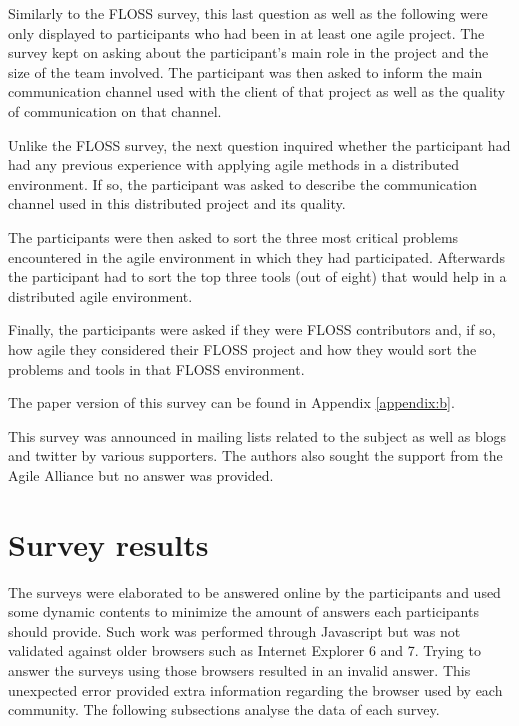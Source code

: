 \documentclass[lnbip]{svmultln}
\newcommand{\footnoterecall}[1]{
  \footnotemark[\value{#1}]
}
\begin{document}
Similarly to the FLOSS survey, this last question as well as the
following were only displayed to participants who had been in at least
one agile project. The survey kept on asking about the participant's
main role in the project and the size of the team involved. The
participant was then asked to inform the main communication channel
used with the client of that project as well as the quality of
communication on that channel.

Unlike the FLOSS survey, the next question inquired whether the
participant had had any previous experience with applying agile
methods in a distributed environment. If so, the participant was asked
to describe the communication channel used in this distributed project
and its quality.

The participants were then asked to sort the three most critical
problems encountered in the agile environment in which they had
participated. Afterwards the participant had to sort the top three
tools (out of eight) that would help in a distributed agile
environment.

Finally, the participants were asked if they were FLOSS contributors
and, if so, how agile they considered their FLOSS project and how
they would sort the problems and tools in that FLOSS environment.

The paper version of this survey can be found in Appendix
\ref{appendix:b}.\footnoterecall{onlineoff}

This survey was announced in mailing lists related to the subject as
well as blogs and twitter by various supporters. The authors also
sought the support from the Agile Alliance but no answer was provided.

\section{Survey results}
\label{sec:results}

The surveys were elaborated to be answered online by the participants
and used some dynamic contents to minimize the amount of answers each
participants should provide. Such work was performed through
Javascript but was not validated against older browsers such as
Internet Explorer 6 and 7. Trying to answer the surveys using those
browsers resulted in an invalid answer. This unexpected error provided
extra information regarding the browser used by each community. The
following subsections analyse the data of each survey.
\end{document}
